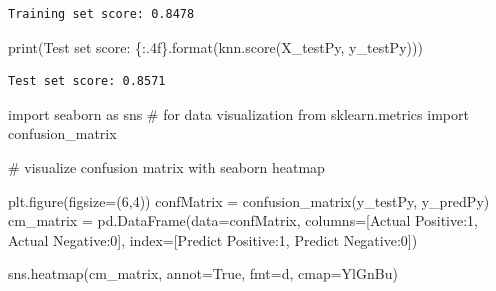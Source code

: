 \documentclass[
  letterpaper,
  DIV=11,
  numbers=noendperiod]{scrartcl}
\newenvironment{Shaded}{\begin{snugshade}}{\end{snugshade}}
\newcommand{\BuiltInTok}[1]{\textcolor[rgb]{0.00,0.23,0.31}{#1}}
\newcommand{\CommentTok}[1]{\textcolor[rgb]{0.37,0.37,0.37}{#1}}
\newcommand{\DecValTok}[1]{\textcolor[rgb]{0.68,0.00,0.00}{#1}}
\newcommand{\ImportTok}[1]{\textcolor[rgb]{0.00,0.46,0.62}{#1}}
\newcommand{\NormalTok}[1]{\textcolor[rgb]{0.00,0.23,0.31}{#1}}
\newcommand{\OperatorTok}[1]{\textcolor[rgb]{0.37,0.37,0.37}{#1}}
\newcommand{\SpecialCharTok}[1]{\textcolor[rgb]{0.37,0.37,0.37}{#1}}
\newcommand{\StringTok}[1]{\textcolor[rgb]{0.13,0.47,0.30}{#1}}
\newcommand{\VariableTok}[1]{\textcolor[rgb]{0.07,0.07,0.07}{#1}}
\begin{document}
\begin{verbatim}
Training set score: 0.8478
\end{verbatim}

\begin{Shaded}
\begin{Highlighting}[]
\BuiltInTok{print}\NormalTok{(}\StringTok{\textquotesingle{}Test set score: }\SpecialCharTok{\{:.4f\}}\StringTok{\textquotesingle{}}\NormalTok{.}\BuiltInTok{format}\NormalTok{(knn.score(X\_testPy, y\_testPy)))}
\end{Highlighting}
\end{Shaded}

\begin{verbatim}
Test set score: 0.8571
\end{verbatim}

\begin{Shaded}
\begin{Highlighting}[]
\ImportTok{import}\NormalTok{ seaborn }\ImportTok{as}\NormalTok{ sns }\CommentTok{\# for data visualization}
\ImportTok{from}\NormalTok{ sklearn.metrics }\ImportTok{import}\NormalTok{ confusion\_matrix}

\CommentTok{\# visualize confusion matrix with seaborn heatmap}

\NormalTok{plt.figure(figsize}\OperatorTok{=}\NormalTok{(}\DecValTok{6}\NormalTok{,}\DecValTok{4}\NormalTok{))}
\NormalTok{confMatrix }\OperatorTok{=}\NormalTok{ confusion\_matrix(y\_testPy, y\_predPy)}
\NormalTok{cm\_matrix }\OperatorTok{=}\NormalTok{ pd.DataFrame(data}\OperatorTok{=}\NormalTok{confMatrix, columns}\OperatorTok{=}\NormalTok{[}\StringTok{\textquotesingle{}Actual Positive:1\textquotesingle{}}\NormalTok{, }\StringTok{\textquotesingle{}Actual Negative:0\textquotesingle{}}\NormalTok{], index}\OperatorTok{=}\NormalTok{[}\StringTok{\textquotesingle{}Predict Positive:1\textquotesingle{}}\NormalTok{, }\StringTok{\textquotesingle{}Predict Negative:0\textquotesingle{}}\NormalTok{])}

\NormalTok{sns.heatmap(cm\_matrix, annot}\OperatorTok{=}\VariableTok{True}\NormalTok{, fmt}\OperatorTok{=}\StringTok{\textquotesingle{}d\textquotesingle{}}\NormalTok{, cmap}\OperatorTok{=}\StringTok{\textquotesingle{}YlGnBu\textquotesingle{}}\NormalTok{)}
\end{Highlighting}
\end{Shaded}
\end{document}
